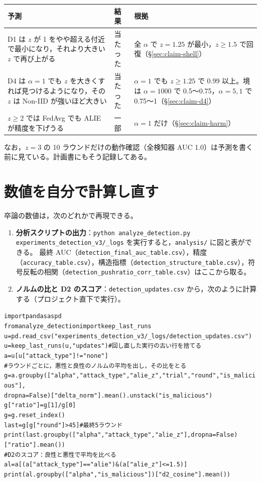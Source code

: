 \documentclass[a4j, dvipdfmx]{jsarticle}  %
\newenvironment{cmd}{\par\vspace{0.3em}\begin{alltt}\small}{\end{alltt}\vspace{0.3em}\par}
\begin{document}
\begin{table}[H]
\centering
\begin{tabular}{@{}P{6.4cm} P{1.8cm} P{7.1cm}@{}}
\toprule
予測 & 結果 & 根拠 \\
\midrule
D1 は $z$ が 1 をやや超える付近で最小になり，それより大きい $z$ で再び上がる & 当たった & 全 $\alpha$ で $z = 1.25$ が最小，$z \ge 1.5$ で回復（\S\ref{sec:claim-shell}） \\
D4 は $\alpha = 1$ でも $z$ を大きくすれば見つけるようになり，その $z$ は Non-IID が強いほど大きい & 当たった & $\alpha = 1$ でも $z \ge 1.25$ で 0.99 以上。境は $\alpha = 1000$ で 0.5〜0.75，$\alpha = 5, 1$ で 0.75〜1（\S\ref{sec:claim-d4}） \\
$z \ge 2$ では FedAvg でも ALIE が精度を下げうる & 一部 & $\alpha = 1$ だけ（\S\ref{sec:claim-harm}） \\
\bottomrule
\end{tabular}
\end{table}

なお，$z = 3$ の 10 ラウンドだけの動作確認（全検知器 AUC 1.0）は予測を書く前に見ている。計画書にもそう記録してある。

\section{数値を自分で計算し直す}
\label{sec:claims-recompute}

卒論の数値は，次のどれかで再現できる。
\begin{enumerate}
  \item \textbf{分析スクリプトの出力}：\texttt{python analyze\_detection.py experiments\_detection\_v3/\_logs} を実行すると，\texttt{analysis/} に図と表ができる。
        最終 AUC（\texttt{detection\_final\_auc\_table.csv}），精度（\texttt{accuracy\_table.csv}），構造指標（\texttt{detection\_structure\_table.csv}），符号反転の相関（\texttt{detection\_pushratio\_corr\_table.csv}）はここから取る。
  \item \textbf{ノルムの比と D2 のスコア}：\texttt{detection\_updates.csv} から，次のように計算する（プロジェクト直下で実行）。
\end{enumerate}

\begin{cmd}
import pandas as pd
from analyze_detection import keep_last_runs
u = pd.read_csv("experiments_detection_v3/_logs/detection_updates.csv")
u = keep_last_runs(u, "updates")            # 回し直した実行の古い行を捨てる
a = u[u["attack_type"] != "none"]
# ラウンドごとに，悪性と良性のノルムの平均を出し，その比をとる
g = a.groupby(["alpha", "attack_type", "alie_z", "trial", "round", "is_malicious"],
              dropna=False)["delta_norm"].mean().unstack("is_malicious")
g["ratio"] = g[1] / g[0]
g = g.reset_index()
last = g[g["round"] > 45]                    # 最終 5 ラウンド
print(last.groupby(["alpha", "attack_type", "alie_z"], dropna=False)["ratio"].mean())
# D2 のスコア：良性と悪性で平均を比べる
al = a[(a["attack_type"] == "alie") & (a["alie_z"] <= 1.5)]
print(al.groupby(["alpha", "is_malicious"])["d2_cosine"].mean())
\end{cmd}
\end{document}
